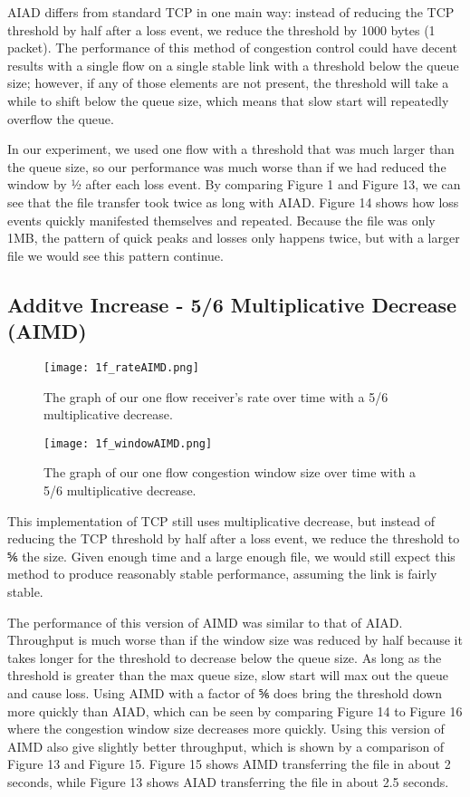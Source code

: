 \documentclass[11pt]{article}
\begin{document}
AIAD differs from standard TCP in one main way: instead of reducing the TCP threshold by half after a loss event, we reduce the threshold by 1000 bytes (1 packet). The performance of this method of congestion control could have decent results with a single flow on a single stable link with a threshold below the queue size; however, if any of those elements are not present, the threshold will take a while to shift below the queue size, which means that slow start will repeatedly overflow the queue.

In our experiment, we used one flow with a threshold that was much larger than the queue size, so our performance was much worse than if we had reduced the window by ½ after each loss event. By comparing Figure 1 and Figure 13, we can see that the file transfer took twice as long with AIAD. Figure 14 shows how loss events quickly manifested themselves and repeated. Because the file was only 1MB, the pattern of quick peaks and losses only happens twice, but with a larger file we would see this pattern continue.


\subsection{Additve Increase - 5/6 Multiplicative Decrease (AIMD)}

\begin{figure}[H]
\caption{The graph of our one flow receiver's rate over time with a 5/6 multiplicative decrease.}
  \label{figure15}
    \centering
    \texttt{[image: 1f\_rateAIMD.png]}
\end{figure}

\begin{figure}[H]
\caption{The graph of our one flow congestion window size over time with a 5/6 multiplicative decrease.}
  \label{figure16}
    \centering
    \texttt{[image: 1f\_windowAIMD.png]}
\end{figure}

This implementation of TCP still uses multiplicative decrease, but instead of reducing the TCP threshold by half after a loss event, we reduce the threshold to ⅚ the size. Given enough time and a large enough file, we would still expect this method to produce reasonably stable performance, assuming the link is fairly stable. 

The performance of this version of AIMD was similar to that of AIAD. Throughput is much worse than if the window size was reduced by half because it takes longer for the threshold to decrease below the queue size. As long as the threshold is greater than the max queue size, slow start will max out the queue and cause loss. Using AIMD with a factor of ⅚ does bring the threshold down more quickly than AIAD, which can be seen by comparing Figure 14 to Figure 16 where the congestion window size decreases more quickly. Using this version of AIMD also give slightly better throughput, which is shown by a comparison of Figure 13 and Figure 15. Figure 15 shows AIMD transferring the file in about 2 seconds, while Figure 13 shows AIAD transferring the file in about 2.5 seconds.
\end{document}
